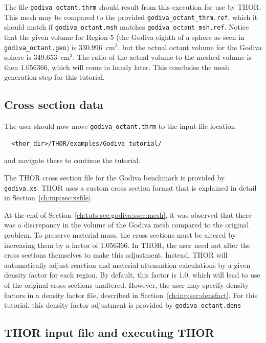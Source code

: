 The file \verb"godiva_octant.thrm" should result from this execution for use by THOR.
This mesh may be compared to the provided \verb"godiva_octant_thrm.ref", which it should match if \verb"godiva_octant.msh" matches \verb"godiva_octant_msh.ref".
Notice that the given volume for Region 5 (the Godiva eighth of a sphere as seen in \verb"godiva_octant.geo") is 330.996~cm$^3$, but the actual octant volume for the Godiva sphere is 349.653~cm$^3$.
The ratio of the actual volume to the meshed volume is then 1.056366, which will come in handy later.
This concludes the mesh generation step for this tutorial.

\subsection{Cross section data}

The user should now move \verb"godiva_octant.thrm" to the input file location
\begin{verbatim}
  <thor_dir>/THOR/examples/Godiva_tutorial/
\end{verbatim}
and navigate there to continue the tutorial.

The \ac{THOR} cross section file for the Godiva benchmark is provided by \verb"godiva.xs".
\ac{THOR} uses a custom cross section format that is explained in detail in Section~\ref{ch:inp:sec:xsfile}.

At the end of Section~\ref{ch:tuts:sec:godiva:ssec:mesh}, it was observed that there was a discrepancy in the volume of the Godiva mesh compared to the original problem.
To preserve material mass, the cross sections must be altered by increasing them by a factor of 1.056366.
In \ac{THOR}, the user need not alter the cross sections themselves to make this adjustment.
Instead, \ac{THOR} will automatically adjust reaction and material attenuation calculations by a given density factor for each region.
By default, this factor is 1.0, which will lead to use of the original cross sections unaltered.
However, the user may specify density factors in a density factor file, described in Section~\ref{ch:inp:sec:densfact}.
For this tutorial, this density factor adjustment is provided by \verb"godiva_octant.dens"

\subsection{THOR input file and executing THOR}

